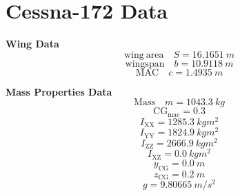 \documentclass[lettersize,journal]{IEEEtran}
\begin{document}
{\appendices

\section{Cessna-172 Data \cite{ref12}}\label{apdx:Cessna172-data}

\centering

\vfill\null
\textbf{Wing Data}
\begin{equation}
\mathrm{wing\ area} \quad S = 16.1651\ m
\end{equation}
\begin{equation}
\mathrm{wing span} \quad b = 10.9118\ m
\end{equation}
\begin{equation}
\mathrm{MAC} \quad c = 1.4935\ m
\end{equation}

\vfill\null
\textbf{Mass Properties Data}
\begin{equation}
\mathrm{Mass} \quad m = 1043.3\ kg
\end{equation}
\begin{equation}
\mathrm{CG}_{\mathrm{mac}} = 0.3
\end{equation}
\begin{equation}
I_{\mathrm{XX}} = 1285.3\ kgm^2
\end{equation}
\begin{equation}
I_{\mathrm{YY}} = 1824.9\ kgm^2
\end{equation}
\begin{equation}
I_{\mathrm{ZZ}} = 2666.9\ kgm^2
\end{equation}
\begin{equation}
I_{\mathrm{XZ}} = 0.0\ kgm^2
\end{equation}
\begin{equation}
y_{\mathrm{CG}} = 0.0\ m
\end{equation}
\begin{equation}
z_{\mathrm{CG}} = 0.2\ m
\end{equation}
\begin{equation}
g = 9.80665\ m/s^2
\end{equation}

}
\end{document}

